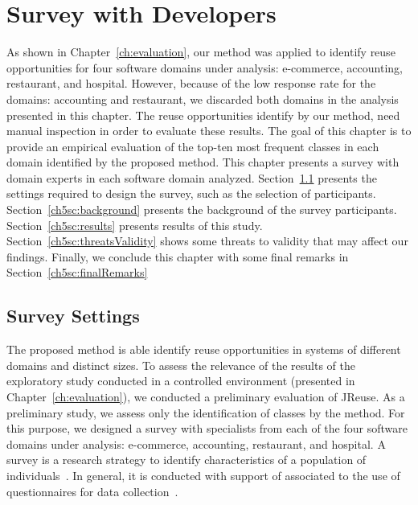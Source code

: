 \chapter{Survey with Developers}
\label{ch:survey}

As shown in Chapter~\ref{ch:evaluation}, our method was applied to identify reuse opportunities for four software domains under analysis: e-commerce, accounting, restaurant, and hospital. However,  because of the low response rate for the domains: accounting and restaurant, we discarded both domains in the analysis presented in this chapter. The reuse opportunities identify by our method, need manual inspection in order to evaluate these  results. The goal of this chapter is to provide an empirical evaluation of the top-ten most frequent classes in each domain identified by the proposed method. This chapter presents a survey with domain experts in each software domain analyzed. Section~\ref{ch5sc:settings} presents the settings required to design the survey, such as the selection of participants. Section~\ref{ch5sc:background} presents the background of the survey participants. Section~\ref{ch5sc:results} presents results of this study. Section~\ref{ch5sc:threatsValidity} shows some threats to validity that  may affect our findings. Finally, we conclude this chapter with some final remarks in Section~\ref{ch5sc:finalRemarks}





\section{Survey Settings}
\label{ch5sc:settings}

The proposed method is able identify reuse opportunities in systems of different domains and  distinct sizes. To assess the relevance of the results of the exploratory study conducted in a controlled environment (presented in Chapter~\ref{ch:evaluation}), we conducted a preliminary evaluation of JReuse. As a preliminary study, we assess only the identification of classes by the method. For this purpose, we designed a survey with specialists from each of the four software domains under analysis: e-commerce, accounting, restaurant, and hospital. A survey is a research strategy to identify characteristics of a population of individuals~\citep{wohlin2012experimentation}. In general, it is conducted with support of associated to the use of questionnaires for data collection~\citep{Easterbrook2008}. 

